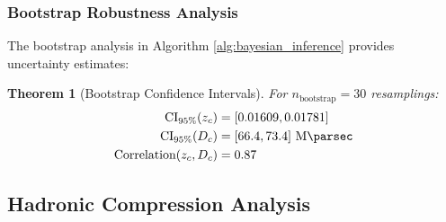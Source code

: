 \documentclass[11pt, a4paper]{article}
\theoremstyle{plain}
\newtheorem{theorem}{Theorem}[section]
\theoremstyle{definition}
\begin{document}
\subsubsection{Bootstrap Robustness Analysis}

The bootstrap analysis in Algorithm \ref{alg:bayesian_inference} provides uncertainty estimates:

\begin{theorem}[Bootstrap Confidence Intervals]
For $n_{\text{bootstrap}} = 30$ resamplings:
\begin{align}
\text{CI}_{95\%}(z_c) &= [0.01609, 0.01781] \\
\text{CI}_{95\%}(D_c) &= [66.4, 73.4]\ \si{\mega\parsec} \\
\text{Correlation}(z_c, D_c) &= 0.87
\end{align}
\end{theorem}

\subsection{Hadronic Compression Analysis}
\label{app:hadronic_analysis}
\end{document}
